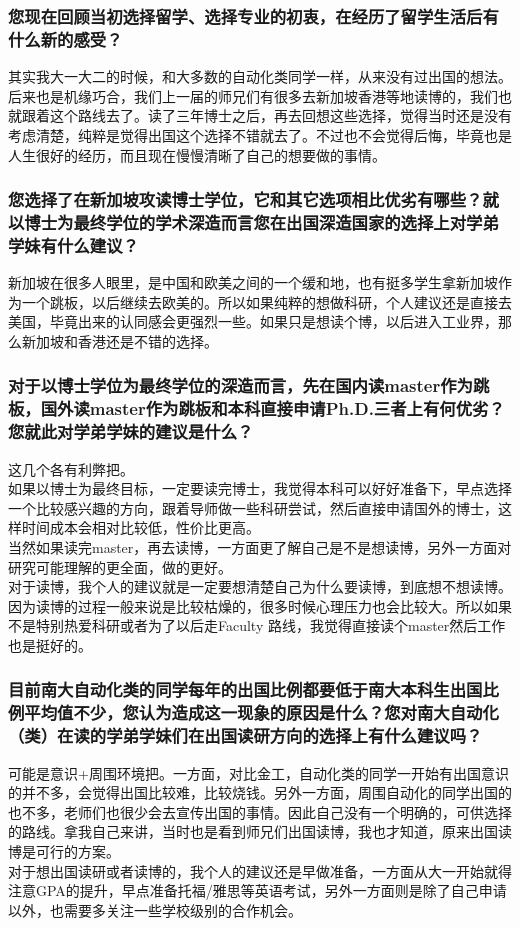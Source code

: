 \documentclass[a4paper,UTF8]{book}
\begin{document}
    \subsubsection*{您现在回顾当初选择留学、选择专业的初衷，在经历了留学生活后有什么新的感受？}
    其实我大一大二的时候，和大多数的自动化类同学一样，从来没有过出国的想法。后来也是机缘巧合，我们上一届的师兄们有很多去新加坡香港等地读博的，我们也就跟着这个路线去了。读了三年博士之后，再去回想这些选择，觉得当时还是没有考虑清楚，纯粹是觉得出国这个选择不错就去了。不过也不会觉得后悔，毕竟也是人生很好的经历，而且现在慢慢清晰了自己的想要做的事情。

    \subsubsection*{您选择了在新加坡攻读博士学位，它和其它选项相比优劣有哪些？就以博士为最终学位的学术深造而言您在出国深造国家的选择上对学弟学妹有什么建议？}
    新加坡在很多人眼里，是中国和欧美之间的一个缓和地，也有挺多学生拿新加坡作为一个跳板，以后继续去欧美的。所以如果纯粹的想做科研，个人建议还是直接去美国，毕竟出来的认同感会更强烈一些。如果只是想读个博，以后进入工业界，那么新加坡和香港还是不错的选择。

    \subsubsection*{对于以博士学位为最终学位的深造而言，先在国内读master作为跳板，国外读master作为跳板和本科直接申请Ph.D.三者上有何优劣？您就此对学弟学妹的建议是什么？}
    这几个各有利弊把。\\
    如果以博士为最终目标，一定要读完博士，我觉得本科可以好好准备下，早点选择一个比较感兴趣的方向，跟着导师做一些科研尝试，然后直接申请国外的博士，这样时间成本会相对比较低，性价比更高。\\
    当然如果读完master，再去读博，一方面更了解自己是不是想读博，另外一方面对研究可能理解的更全面，做的更好。\\
    对于读博，我个人的建议就是一定要想清楚自己为什么要读博，到底想不想读博。因为读博的过程一般来说是比较枯燥的，很多时候心理压力也会比较大。所以如果不是特别热爱科研或者为了以后走Faculty 路线，我觉得直接读个master然后工作也是挺好的。

    \subsubsection*{目前南大自动化类的同学每年的出国比例都要低于南大本科生出国比例平均值不少，您认为造成这一现象的原因是什么？您对南大自动化（类）在读的学弟学妹们在出国读研方向的选择上有什么建议吗？}
    可能是意识+周围环境把。一方面，对比金工，自动化类的同学一开始有出国意识的并不多，会觉得出国比较难，比较烧钱。另外一方面，周围自动化的同学出国的也不多，老师们也很少会去宣传出国的事情。因此自己没有一个明确的，可供选择的路线。拿我自己来讲，当时也是看到师兄们出国读博，我也才知道，原来出国读博是可行的方案。\\
    对于想出国读研或者读博的，我个人的建议还是早做准备，一方面从大一开始就得注意GPA的提升，早点准备托福/雅思等英语考试，另外一方面则是除了自己申请以外，也需要多关注一些学校级别的合作机会。
\end{document}
